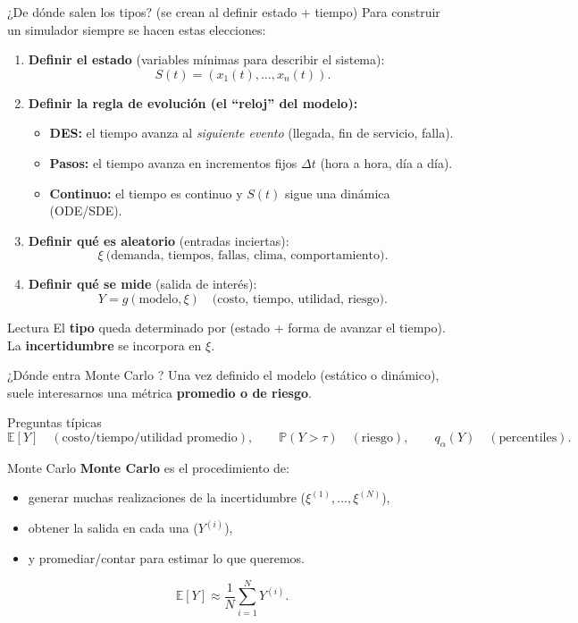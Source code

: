 \documentclass[aspectratio=1610, 9pt]{beamer}
\begin{document}
\begin{frame}{¿De dónde salen los tipos? (se crean al definir estado + tiempo)}
Para construir un simulador siempre se hacen estas elecciones:

\vspace{0.2cm}
\begin{enumerate}
  \item \textbf{Definir el estado} (variables mínimas para describir el sistema):
  \[
  S(t)=(x_1(t),\dots,x_n(t)).
  \]
  \item \textbf{Definir la regla de evolución (el “reloj” del modelo):}
  \begin{itemize}
    \item \textbf{DES:} el tiempo avanza al \emph{siguiente evento} (llegada, fin de servicio, falla).
    \item \textbf{Pasos:} el tiempo avanza en incrementos fijos $\Delta t$ (hora a hora, día a día).
    \item \textbf{Continuo:} el tiempo es continuo y $S(t)$ sigue una dinámica (ODE/SDE).
  \end{itemize}
  \item \textbf{Definir qué es aleatorio} (entradas inciertas):
  \[
  \xi \ \text{(demanda, tiempos, fallas, clima, comportamiento)}.
  \]
  \item \textbf{Definir qué se mide} (salida de interés):
  \[
  Y = g(\text{modelo},\xi)\quad \text{(costo, tiempo, utilidad, riesgo)}.
  \]
\end{enumerate}

\begin{block}{Lectura}
El \textbf{tipo} queda determinado por (estado + forma de avanzar el tiempo).  
La \textbf{incertidumbre} se incorpora en $\xi$.
\end{block}
\end{frame}


\begin{frame}{¿Dónde entra Monte Carlo ?}
Una vez definido el modelo (estático o dinámico), suele interesarnos una métrica \textbf{promedio o de riesgo}.

\vspace{0.2cm}
\begin{block}{Preguntas típicas}
\[
\mathbb E[Y]\quad (\text{costo/tiempo/utilidad promedio}),\qquad
\mathbb P(Y>\tau)\quad (\text{riesgo}),\qquad
q_\alpha(Y)\quad (\text{percentiles}).
\]
\end{block}

\begin{alertblock}{Monte Carlo}
\textbf{Monte Carlo} es el procedimiento de:
\begin{itemize}
  \item generar muchas realizaciones de la incertidumbre ($\xi^{(1)},\dots,\xi^{(N)}$),
  \item obtener la salida en cada una ($Y^{(i)}$),
  \item y promediar/contar para estimar lo que queremos.
\end{itemize}
\[
\mathbb E[Y] \approx \frac{1}{N}\sum_{i=1}^N Y^{(i)}.
\]
\end{alertblock}
\end{frame}
\end{document}
